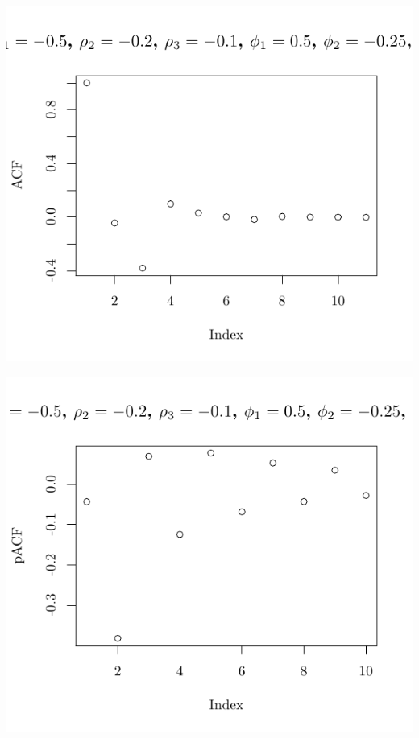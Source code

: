 \documentclass[10pt]{paper}\usepackage[]{graphicx}\usepackage[]{color}
\makeatletter
\def\maxwidth{ %
  \ifdim\Gin@nat@width>\linewidth
    \linewidth
  \else
    \Gin@nat@width
  \fi
}
\newenvironment{knitrout}{}{} %
\makeatother
\begin{document}
\begin{knitrout}
{\centering \includegraphics[width=\maxwidth]{figure/graphics-plotter-149} 

}




{\centering \includegraphics[width=\maxwidth]{figure/graphics-plotter-150} 

}





\end{knitrout}
\end{document}
